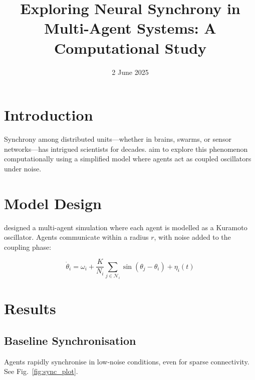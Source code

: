 \documentclass{manuscript_modern}
\title{Exploring Neural Synchrony in Multi-Agent Systems: A Computational Study}
\date{2 June 2025}
\begin{document}
	
	\maketitleblock
	
	\begin{maintext}
	
	\section{Introduction}

		Synchrony among distributed units---whether in brains, swarms, or sensor networks---has intrigued scientists for decades. \We{} aim to explore this phenomenon computationally using a simplified model where agents act as coupled oscillators under noise.
		
		\lipsum[2]

		\begin{summaryblock}
		\end{summaryblock}
		
		\lipsum[3] \par{}
		
		\lipsum[4]
		
		\section{Model Design}
		\We{} designed a multi-agent simulation where each agent is modelled as a Kuramoto oscillator. Agents communicate within a radius $r$, with noise added to the coupling phase:
		
		\begin{equation}
			\dot{\theta}_i = \omega_i + \frac{K}{N_i} \sum_{j \in \mathcal{N}_i} \sin(\theta_j - \theta_i) + \eta_i(t)
		\end{equation}
		
		\lipsum[3-4]
		
		\section{Results}
		\subsection{Baseline Synchronisation}
		Agents rapidly synchronise in low-noise conditions, even for sparse connectivity. See Fig.~\ref{fig:sync_plot}.
		

\end{maintext}
\end{document}
